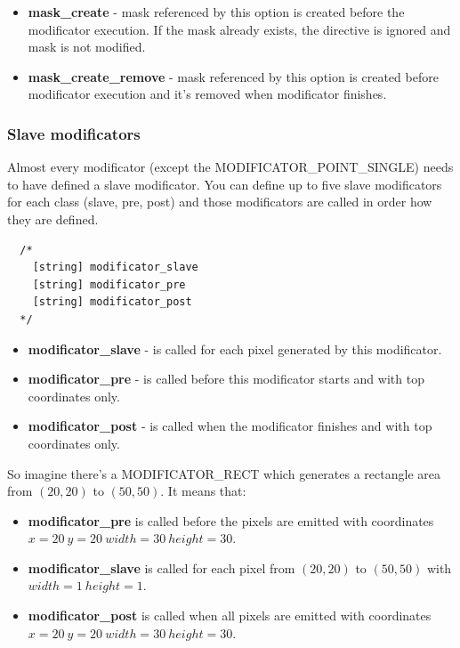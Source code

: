 \documentclass[9pt]{article}
\begin{document}
\begin{itemize}
\item{\bf mask\_create} - mask referenced by this option is created before 
the modificator execution. If the mask already exists, the directive is ignored and
mask is not modified.
\item{\bf mask\_create\_remove} - mask referenced by this option is created before 
modificator execution and it's removed when modificator finishes.
\end{itemize}

\subsubsection{Slave modificators}

Almost every modificator (except the MODIFICATOR\_POINT\_SINGLE) needs to 
have defined a slave modificator. You can define up to five slave modificators 
for each class (slave, pre, post) and those modificators are called in 
order how they are defined.

\begin{verbatim}
  /*
    [string] modificator_slave
    [string] modificator_pre
    [string] modificator_post
  */  
\end{verbatim}

\begin{itemize}
\item{\bf modificator\_slave} - is called for each pixel generated 
by this modificator.
\item{\bf modificator\_pre} - is called before this modificator starts 
and with top coordinates only.
\item{\bf modificator\_post} - is called when the modificator finishes 
and with top coordinates only.
\end{itemize}

So imagine there's a MODIFICATOR\_RECT which generates a rectangle area 
from \((20,20)\) to \((50,50)\). It means that:

\begin{itemize}
\item{\bf modificator\_pre} is called before the pixels are emitted with 
coordinates \newline\(x = 20~y = 20~width = 30~height = 30\).
\item{\bf modificator\_slave} is called for each pixel
from \((20,20)\) to \((50,50)\) with \newline\(width = 1~height = 1\).
\item{\bf modificator\_post} is called when all pixels are emitted
with coordinates \newline\(x = 20~y = 20~width = 30~height = 30\).
\end{itemize}
\end{document}
